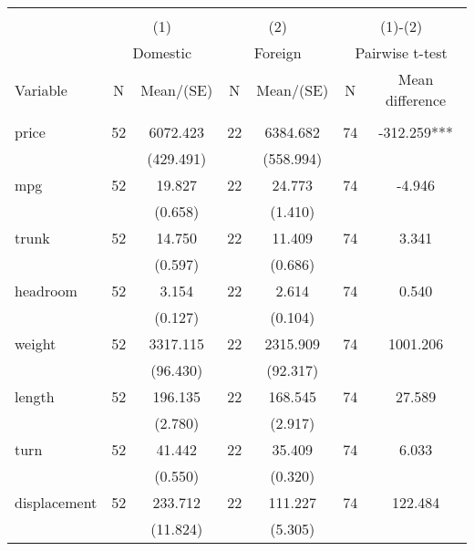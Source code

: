 
\begin{tabular}{@{\extracolsep{5pt}}lcccccc}
\\[-1.8ex]\hline \hline \\[-1.8ex]
 & \multicolumn{2}{c}{(1)}  & \multicolumn{2}{c}{(2)}  & \multicolumn{2}{c}{(1)-(2)} \\
 & \multicolumn{2}{c}{Domestic}  & \multicolumn{2}{c}{Foreign}  & \multicolumn{2}{c}{Pairwise t-test}  \\
Variable & N & Mean/(SE) & N & Mean/(SE) & N & Mean difference \\ \hline \\[-1.8ex] 
price   & 52    & 6072.423    & 22    & 6384.682    & 74    & -312.259***   \\
 &   & (429.491)  &   & (558.994)  &   &  \\ [1ex]
mpg   & 52    & 19.827    & 22    & 24.773    & 74    & -4.946   \\
 &   & (0.658)  &   & (1.410)  &   &  \\ [1ex]
trunk   & 52    & 14.750    & 22    & 11.409    & 74    & 3.341   \\
 &   & (0.597)  &   & (0.686)  &   &  \\ [1ex]
headroom   & 52    & 3.154    & 22    & 2.614    & 74    & 0.540   \\
 &   & (0.127)  &   & (0.104)  &   &  \\ [1ex]
weight   & 52    & 3317.115    & 22    & 2315.909    & 74    & 1001.206   \\
 &   & (96.430)  &   & (92.317)  &   &  \\ [1ex]
length   & 52    & 196.135    & 22    & 168.545    & 74    & 27.589   \\
 &   & (2.780)  &   & (2.917)  &   &  \\ [1ex]
turn   & 52    & 41.442    & 22    & 35.409    & 74    & 6.033   \\
 &   & (0.550)  &   & (0.320)  &   &  \\ [1ex]
displacement   & 52    & 233.712    & 22    & 111.227    & 74    & 122.484   \\
 &   & (11.824)  &   & (5.305)  &   &  \\ [1ex]

\end{tabular}
